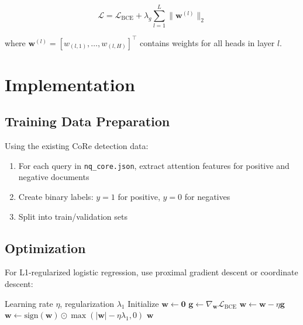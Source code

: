 \documentclass[11pt,a4paper]{article}
\begin{document}
\begin{equation}
    \mathcal{L} = \mathcal{L}_{\text{BCE}} + \lambda_g \sum_{l=1}^{L} \|\mathbf{w}^{(l)}\|_2
\end{equation}

where $\mathbf{w}^{(l)} = [w_{(l,1)}, \ldots, w_{(l,H)}]^\top$ contains weights for all heads in layer $l$.

\section{Implementation}

\subsection{Training Data Preparation}

Using the existing CoRe detection data:

\begin{enumerate}
    \item For each query in \texttt{nq\_core.json}, extract attention features for positive and negative documents
    \item Create binary labels: $y=1$ for positive, $y=0$ for negatives
    \item Split into train/validation sets
\end{enumerate}

\subsection{Optimization}

For L1-regularized logistic regression, use proximal gradient descent or coordinate descent:

\begin{algorithm}
\caption{Proximal Gradient Descent for L1-Regularized Logistic Regression}
\begin{algorithmic}[1]
\Require Learning rate $\eta$, regularization $\lambda_1$
\State Initialize $\mathbf{w} \gets \mathbf{0}$
    \State $\mathbf{g} \gets \nabla_{\mathbf{w}} \mathcal{L}_{\text{BCE}}$ 
    \State $\mathbf{w} \gets \mathbf{w} - \eta \mathbf{g}$ 
    \State $\mathbf{w} \gets \text{sign}(\mathbf{w}) \odot \max(|\mathbf{w}| - \eta\lambda_1, 0)$ 
\EndWhile
\State \Return $\mathbf{w}$
\end{algorithmic}
\end{algorithm}
\end{document}
